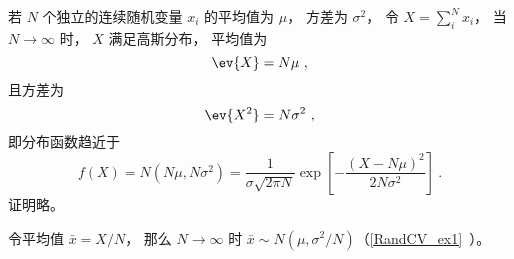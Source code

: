 
\begin{issues}
\issueDraft
\end{issues}


若 $N$ 个独立的连续随机变量 $x_i$ 的平均值为 $\mu$， 方差为 $\sigma^2$， 令 $X = \sum_i^N x_i$， 当 $N \to \infty$ 时， $X$ 满足高斯分布， 平均值为
\begin{equation}
\ev{X} = N\mu~,
\end{equation}
且方差为
\begin{equation}
\ev{X^2} = N\sigma^2~,
\end{equation}
即分布函数趋近于
\begin{equation}
f(X) = N(N\mu, N\sigma^2) = \frac{1}{\sigma\sqrt{2\pi N}} \exp[-\frac{(X-N\mu)^2}{2N\sigma^2}]~.
\end{equation}
证明略。

令平均值 $\bar x = X/N$， 那么 $N\to\infty$ 时 $\bar x\sim N(\mu, \sigma^2/N)$（\autoref{RandCV_ex1}~）。
